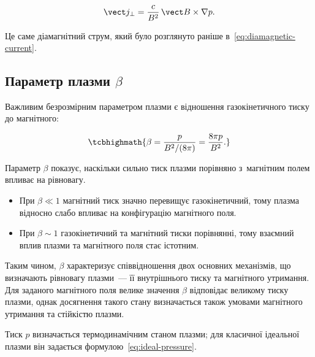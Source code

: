 \begin{equation*}
    \vect j_\perp
    =
    \frac{c}{B^2}\,
    \vect B\times\nabla p.
\end{equation*}

Це саме діамагнітний струм, який було розглянуто раніше в~\eqref{eq:diamagnetic-current}.



\subsection{Параметр плазми \texorpdfstring{$\beta$}{beta}}



Важливим безрозмірним параметром плазми є відношення газокінетичного тиску до магнітного:

\begin{equation}\label{eq:beta}
    \tcbhighmath{
    \beta
    =
    \frac{p}{B^2/(8\pi)}
    =
    \frac{8\pi p}{B^2}.
    }
\end{equation}

Параметр $\beta$ показує, наскільки сильно тиск плазми порівняно з~магнітним полем впливає
на рівновагу.

\begin{itemize}

    \item При $\beta\ll1$ магнітний тиск значно перевищує газокінетичний, тому плазма
      відносно слабо впливає на конфігурацію магнітного поля.

    \item При $\beta\sim1$ газокінетичний та магнітний тиски порівнянні, тому взаємний
      вплив плазми та магнітного поля стає істотним.

\end{itemize}

Таким чином, $\beta$ характеризує співвідношення двох основних механізмів, що визначають
рівновагу плазми~--- її внутрішнього тиску та магнітного утримання. Для заданого
магнітного поля велике значення $\beta$ відповідає великому тиску плазми, однак досягнення
такого стану визначається також умовами магнітного утримання та стійкістю плазми.

Тиск $p$ визначається термодинамічним станом плазми; для класичної ідеальної плазми він
задається формулою~\eqref{eq:ideal-pressure}.


